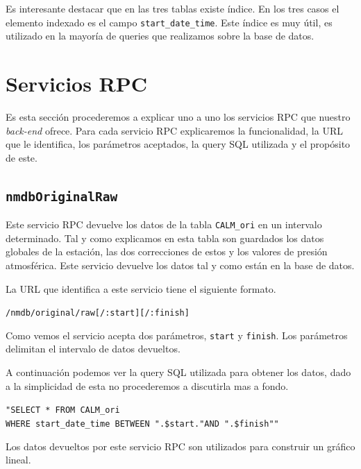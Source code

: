 	\par 
	Es interesante destacar que en las tres tablas existe índice. En los tres casos el elemento indexado es el campo \texttt{start\_date\_time}.
	Este índice es muy útil, es utilizado en la mayoría de queries que realizamos sobre la base de datos. 
\section{Servicios RPC}
	Es esta sección procederemos a explicar uno a uno los servicios RPC que nuestro \emph{back-end} ofrece. Para cada servicio RPC explicaremos la
	funcionalidad, la URL que le identifica, los parámetros aceptados, la query SQL utilizada y el propósito de este.
	\subsection{\texttt{nmdbOriginalRaw}}
		Este servicio RPC devuelve los datos de la tabla \texttt{CALM\_ori} en un intervalo determinado. Tal y como explicamos en esta tabla
		son guardados los datos globales de la estación, las dos correcciones de estos y los valores de presión atmosférica. Este servicio
		devuelve los datos tal y como están en la base de datos. 
	  	\par
		La URL que identifica a este servicio tiene el siguiente formato.
	  		\begin{center} \texttt{/nmdb/original/raw[/:start][/:finish]}  \end{center} 
		Como vemos el servicio acepta dos parámetros, \texttt{start} y \texttt{finish}. Los parámetros delimitan el intervalo de datos
		devueltos.
		\par
		A continuación podemos ver la query SQL utilizada para obtener los datos, dado a la simplicidad de esta no procederemos a discutirla
		mas a fondo.
	  		\begin{center} \texttt{"SELECT * FROM CALM\_ori 
			  		\\	WHERE start\_date\_time BETWEEN \cc".\$start."\cc AND \cc".\$finish"\cc"}
			\end{center} 
		Los datos devueltos por este servicio RPC son utilizados para construir un gráfico lineal.
